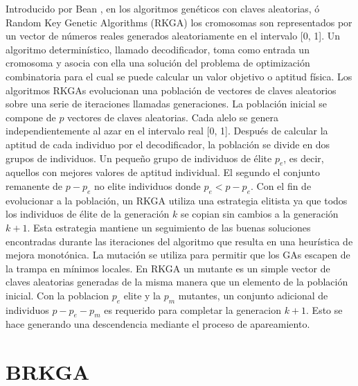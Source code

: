 Introducido por Bean \cite{Bean}, en los algoritmos genéticos con claves aleatorias, ó Random Key Genetic Algorithms (RKGA) los cromosomas son representados por un vector de números reales generados aleatoriamente en el intervalo [0, 1]. Un algoritmo determinístico, llamado decodificador, toma como entrada un cromosoma y asocia con ella una solución del problema de optimización combinatoria para el cual se puede calcular un valor objetivo o aptitud física. Los algoritmos RKGAs evolucionan una población de vectores de claves aleatorios sobre una serie de iteraciones llamadas generaciones. La población inicial se compone de $p$ vectores de claves aleatorias. Cada alelo se genera independientemente al azar en el intervalo real [0, 1]. Después de calcular la aptitud de cada individuo por el decodificador, la población se divide en dos grupos de individuos. Un pequeño grupo de individuos de élite $p_e$, es decir, aquellos con mejores valores de aptitud individual. El segundo el conjunto remanente de $p-p_e$ no elite individuos donde $p_e<p-p_e$. Con el fin de evolucionar a la población, un RKGA utiliza una estrategia elitista ya que todos los individuos de élite de la generación $k$ se copian sin cambios a la generación $k + 1$. Esta estrategia mantiene un seguimiento de las buenas soluciones encontradas durante las iteraciones del algoritmo que resulta en una heurística de mejora monotónica. La mutación se utiliza para permitir que los GAs escapen de la trampa en mínimos locales. En RKGA un mutante es un simple vector de claves aleatorias generadas de la misma manera que un elemento de la población inicial. Con la poblacion $p_e$ elite y la $p_m$ mutantes, un conjunto adicional de individuos $p - p_e - p_m$ es requerido para completar la generacion $k+1$. Esto se hace generando una descendencia mediante el proceso de apareamiento.

\section{BRKGA}

